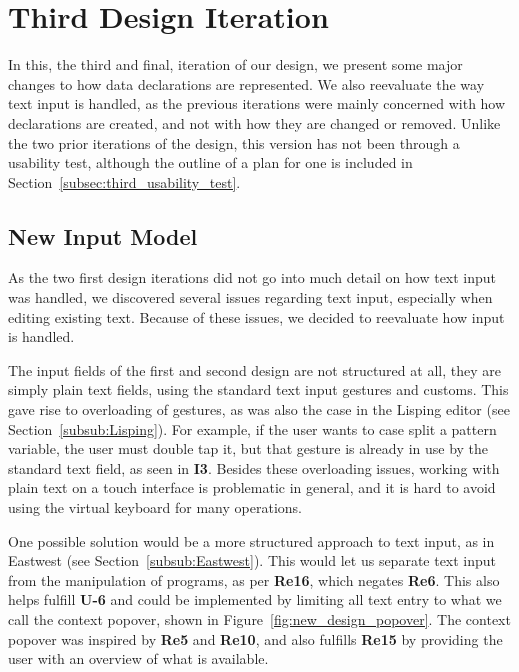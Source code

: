 \chapter{Third Design Iteration}
\label{sec:third_design_iteration}
In this, the third and final, iteration of our design, we present some major changes to how data declarations are represented.
We also reevaluate the way text input is handled, as the previous iterations were mainly concerned with how declarations are created, and not with how they are changed or removed.
Unlike the two prior iterations of the design, this version has not been through a usability test, although the outline of a plan for one is included in Section~\ref{subsec:third_usability_test}.

\section{New Input Model}
\label{subsec:new_input_model}
As the two first design iterations did not go into much detail on how text input was handled, we discovered several issues regarding text input, especially when editing existing text.
Because of these issues, we decided to reevaluate how input is handled.

The input fields of the first and second design are not structured at all, they are simply plain text fields, using the standard text input gestures and customs.
This gave rise to overloading of gestures, as was also the case in the Lisping editor (see Section~\ref{subsub:Lisping}).
For example, if the user wants to case split a pattern variable, the user must double tap it, but that gesture is already in use by the standard text field, as seen in \textbf{I3}.
Besides these overloading issues, working with plain text on a touch interface is problematic in general, and it is hard to avoid using the virtual keyboard for many operations.

One possible solution would be a more structured approach to text input, as in Eastwest (see Section~\ref{subsub:Eastwest}).
This would let us separate text input from the manipulation of programs, as per \textbf{Re16}, which negates \textbf{Re6}. This also helps fulfill \textbf{U-6} and could be implemented by limiting all text entry to what we call the context popover, shown in Figure~\ref{fig:new_design_popover}.
The context popover was inspired by \textbf{Re5} and \textbf{Re10}, and also fulfills \textbf{Re15} by providing the user with an overview of what is available.

